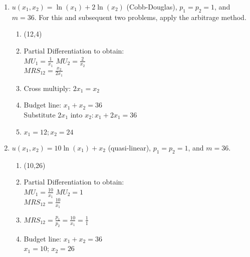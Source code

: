 \documentclass[11pt]{article}
\begin{document}
\begin{enumerate}
\begin{enumerate}
        \item $u(x_{1},x_{2})=\ln(x_{1})+2\ln(x_{2})$ (Cobb-Douglas), $p_{1}=p_{2}=1$, and $m=36$. For this and subsequent two problems, apply the arbitrage method.
        \begin{enumerate}
            \item (12,4)
            \item Partial Differentiation to obtain:\\
            $MU_1 = \frac{1}{x_1}$ $MU_2 = \frac {2}{x_2}$\\
            $MRS_{12} = \frac{x_2}{2x_1}$
            \item Cross multiply: $2x_1=x_2$
            \item Budget line: $x_1+x_2=36$\\
            Substitute $2x_1$ into $x_2: x_1+ 2x_1 =36$
            \item $x_1 =12; x_2 =24$
        \end{enumerate}


        \item $u(x_{1},x_{2})=10\ln(x_{1})+x_{2}$ (quasi-linear), $p_{1}=p_{2}=1$, and $m=36$.
        \begin{enumerate}
            \item (10,26)
            \item Partial Differentiation to obtain:\\
            $MU_1 = \frac{10}{x_1}$ $MU_2 = 1$\\
            $MRS_{12} = \frac{10}{x_1}$
            \item $MRS_{12} = \frac{p_1}{p_2}= \frac{10}{x_1} = \frac{1}{1}$\\
            \item Budget line: $x_1+x_2=36$\\
            $x_1=10$; $x_2=26$
        \end{enumerate}


\end{enumerate}
\end{enumerate}
\end{document}
